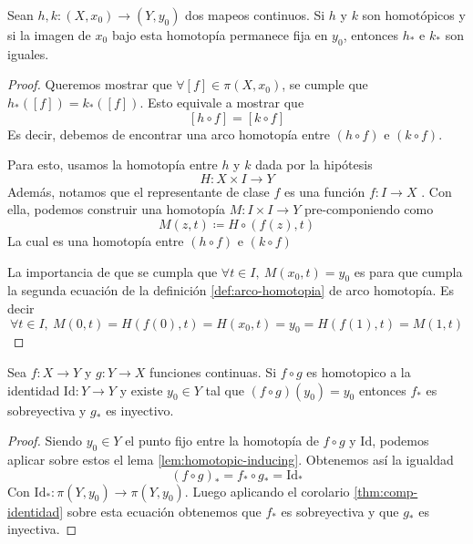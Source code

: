 \begin{lema} \label{lem:homotopic-inducing}
  Sean \(h,k : (X, x_0) \to (Y, y_0)\) dos mapeos continuos. Si \(h\) y
  \(k\) son homotópicos y si la imagen de \(x_0\) bajo esta homotopía permanece
  fija en \(y_0\), entonces \(h_*\) e \(k_*\) son iguales.
\end{lema}
\begin{proof}
  Queremos mostrar que \(\forall [f] \in \pi (X,x_0)\), se cumple que
  \(h_* ([f]) = k_* ([f])\). Esto equivale a mostrar que
  \[ [h \circ f] = [k \circ f] \]
  Es decir, debemos de encontrar una arco homotopía entre \((h \circ
  f)\) e \( (k \circ f)\).

  Para esto, usamos la homotopía entre \(h\) y \(k\) dada por la hipótesis
  \[H : X \times I \to Y \]
  Además, notamos que el representante de clase \(f\) es una función \(f
  : I \to X\) . Con ella, podemos construir una homotopía \(M : I \times I
  \to Y \) pre-componiendo como
  \[ M(z, t) \coloneqq H \circ (f(z), t) \]
  La cual es una homotopía entre \((h \circ f)\) e \((k \circ f)\)

  La importancia de que se cumpla que \( \forall t \in I,\ M (x_0, t) =
  y_0\) es para que cumpla la segunda ecuación de la definición
  \ref{def:arco-homotopia} de arco homotopía. Es decir
  \[ \forall t \in I ,\ M(0,t) = H \left( f (0), t \right) = H (x_0, t)
    = y_0 = H \left( f(1) , t \right) = M (1, t) \]
\end{proof}
\begin{teorema} \label{thm:comp-identidad-homotopia}
  Sea \(f : X \to Y\) y \(g : Y \to X\) funciones continuas. Si \(f
  \circ g\) es homotopico a la identidad \( \mathrm{Id} : Y \to Y\) y
  existe \(y_0 \in Y\) tal que \( (f \circ g ) (y_0) = y_0 \) entonces
  \(f_*\) es sobreyectiva y \(g_*\) es inyectivo.
\end{teorema}
\begin{proof}
  Siendo \(y_0 \in Y\) el punto fijo entre la homotopía de \(f \circ g\)
  y \(\mathrm{Id}\), podemos aplicar sobre estos el lema
  \ref{lem:homotopic-inducing}. Obtenemos así la igualdad
  \[ (f \circ g)_{*} = f_* \circ g_* = \mathrm{Id}_* \]
  Con \(\mathrm{Id}_* : \pi (Y, y_0) \to \pi (Y, y_0)\). Luego
  aplicando el corolario \ref{thm:comp-identidad} sobre esta ecuación
  obtenemos que \(f_*\) es sobreyectiva y que \(g_*\) es inyectiva.
\end{proof}


